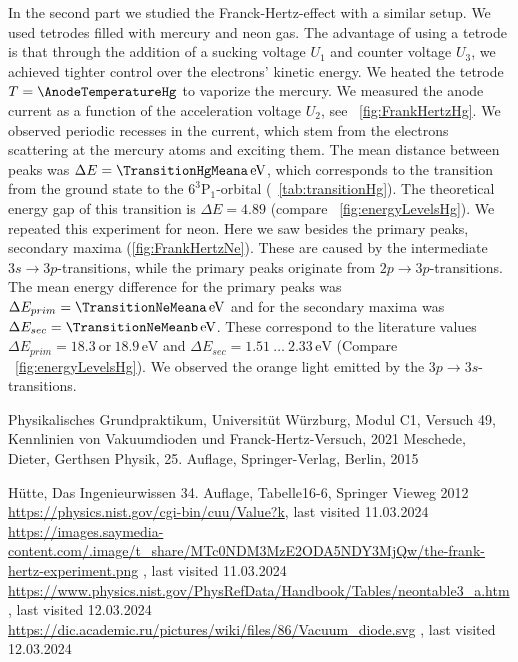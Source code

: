\documentclass[a4paper,10pt,twocolumn]{article}
\newcommand{\eV}{\, \mathrm{eV}}
\newcommand{\HgLevelA}{6^3\mathrm{P}_1}
\newcommand{\TheoreticalTransitionHga}{4.89}
\newcommand{\TheoreticalTransitionNea}{18.9}
\newcommand{\TheoreticalTransitionNeaa}{18.3}
\newcommand{\TheoreticalTransitionNeb}{1.51 \ \dots \ 2.33}
\begin{document}
    In the second part we studied the Franck-Hertz-effect with a similar setup.
    We used tetrodes filled with mercury and neon gas.
    The advantage of using a tetrode is that through the addition of a sucking voltage $U_1$ and counter voltage
    $U_3$, we achieved tighter control over the electrons' kinetic energy.
    We heated the tetrode $T = \AnodeTemperatureHg$ to vaporize the mercury.
    We measured the anode current as a function of the acceleration voltage $U_2$, see ~\autoref{fig:FrankHertzHg}.
    We observed periodic recesses in the current, which stem from the electrons scattering 
    at the mercury atoms and exciting them.
    The mean distance between peaks was $\Delta E = \TransitionHgMeana \eV$, which corresponds to the 
    transition from the ground state to the $\HgLevelA$-orbital (~\autoref{tab:transitionHg}).
    The theoretical energy gap of this transition is $\Delta E = \TheoreticalTransitionHga$
    (compare ~\autoref{fig:energyLevelsHg}).
    We repeated this experiment for neon.
    Here we saw besides the primary peaks, secondary maxima (\autoref{fig:FrankHertzNe}).
    These are caused by the intermediate $3s \rightarrow 3p$-transitions, while the primary peaks originate
    from $2p \rightarrow 3p$-transitions.
    The mean energy difference for the primary peaks was $\Delta E_{prim} = \TransitionNeMeana \eV$ and for the
    secondary maxima was $\Delta E_{sec} = \TransitionNeMeanb \eV$.
    These correspond to the literature values 
    $\Delta E_{prim} = \TheoreticalTransitionNeaa \ \mathrm{or} \ \TheoreticalTransitionNea \eV$
    and $\Delta E_{sec} = \TheoreticalTransitionNeb \eV$ (Compare ~\autoref{fig:energyLevelsHg}).
    We observed the orange light emitted by the $3p \rightarrow 3s$-transitions.


    \begin{thebibliography}{}    %
         Physikalisches Grundpraktikum, Universitüt Würzburg, Modul C1, Versuch 49, Kennlinien von Vakuumdioden
        und Franck-Hertz-Versuch, 2021
         Meschede, Dieter, Gerthsen Physik, 25. Auflage, Springer-Verlag, Berlin, 2015

          Hütte, Das Ingenieurwissen 34. Auflage, Tabelle16-6, Springer Vieweg 2012
          \url{https://physics.nist.gov/cgi-bin/cuu/Value?k}, last visited 11.03.2024
         \url{https://images.saymedia-content.com/.image/t_share/MTc0NDM3MzE2ODA5NDY3MjQw/the-frank-hertz-experiment.png} , last visited 11.03.2024
         \url{https://www.physics.nist.gov/PhysRefData/Handbook/Tables/neontable3_a.htm} , last visited 12.03.2024
         \url{https://dic.academic.ru/pictures/wiki/files/86/Vacuum_diode.svg} , last visited 12.03.2024
    \end{thebibliography}
    
\end{document}
